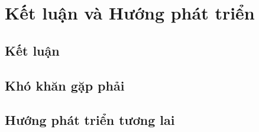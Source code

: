 \chapter{Kết luận và Hướng phát triển}\label{ch:conclusion}

\section{Kết luận}


\section{Khó khăn gặp phải}


\section{Hướng phát triển tương lai}

